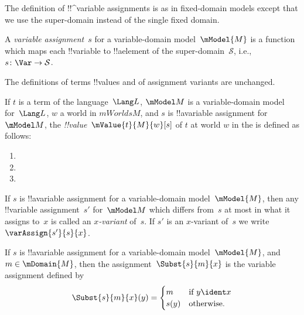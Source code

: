 \documentclass[../../../include/open-logic-section]{subfiles}
\begin{document}


\begin{explain}
The definition of !!^{variable} assignments is as in fixed-domain models except that we use 
the super-domain instead of the single fixed domain. 
\end{explain}

\begin{defn}
A \emph{variable assignment}~$s$ for a variable-domain model~$\mModel{M}$ 
is a function which maps each !!{variable} to !!a{element} of
the super-domain~$\mathcal{S}$,
i.e., $s\colon \Var \to \mathcal{S}$.
\end{defn}

\begin{explain}
The definitions of terms !!{value}s and of 
assignment variants are unchanged.
\end{explain}

\begin{defn}
If $t$ is a term of the language~$\Lang L$, $\mModel M$ is a
variable-domain model for~$\Lang L$, $w$ a world in $mWorlds M$, and $s$
is !!a{variable} assignment for~$\mModel M$, the
\emph{!!{value}}~$\mValue{t}{M}{w}[s]$ of $t$ at world $w$ in the is
defined as follows:
\begin{enumerate}
\item {}
\item {}
\item {}
\end{enumerate}
\end{defn}

\begin{defn}[$x$-Variant]
If $s$ is !!a{variable} assignment for a variable-domain
model~$\mModel{M}$, then any !!{variable} assignment~$s'$ for~$\mModel
M$ which differs from~$s$ at most in what it assigns to~$x$ is called
an \emph{$x$-variant} of~$s$. If $s'$ is an $x$-variant of~$s$ we
write $\varAssign{s'}{s}{x}$.
\end{defn}

\begin{defn}
  If $s$ is !!a{variable} assignment for a variable-domain model~$\mModel{M}$, 
  and $m \in \mDomain{M}$, then the assignment~$\Subst{s}{m}{x}$ is the
  variable assignment defined by
  \[\Subst{s}{m}{x}(y) = \begin{cases}
    m & \text{if } y \ident x\\
    s(y) & \text{otherwise}.
  \end{cases}\]
\end{defn}
\end{document}
